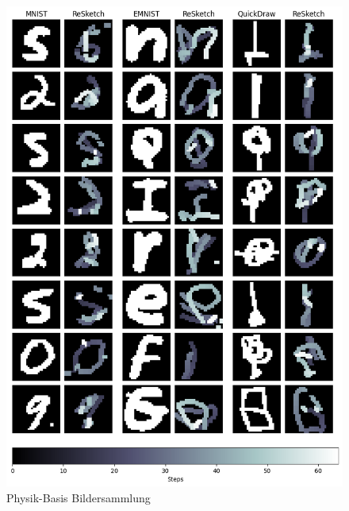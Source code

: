 \begin{figure}[!ht]
    \centering
    \includegraphics[width=\textwidth]{images/resultate/physics-base.png}
    \caption{Physik-Basis Bildersammlung}\label{fig:Physik-Basis}
\end{figure}

